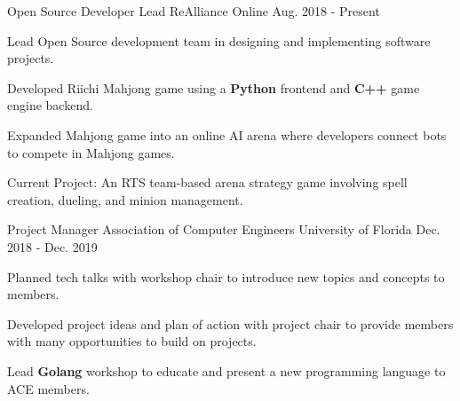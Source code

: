 


\begin{cventries}


\cventry
{Open Source Developer Lead} %
{ReAlliance} %
{Online} %
{Aug. 2018 - Present} %
{ %
	\begin{cvitems}
		\setlength{\itemindent}{.125in}
		\item {Lead Open Source development team in designing and implementing software projects.}
		\item {Developed Riichi Mahjong game using a \textbf{Python} frontend and \textbf{C++} game engine backend.}
		\item {Expanded Mahjong game into an online AI arena where developers connect bots to compete in Mahjong games.}
		\item {Current Project: An RTS team-based arena strategy game involving spell creation, dueling, and minion management.}
	\end{cvitems}
}


\cventry
{Project Manager} %
{Association of Computer Engineers} %
{University of Florida} %
{Dec. 2018 - Dec. 2019} %
{ %
	\begin{cvitems}
		\setlength{\itemindent}{.125in}
		\item {Planned tech talks with workshop chair to introduce new topics and concepts to members.}
		\item {Developed project ideas and plan of action with project chair to provide members with many opportunities to build on projects.}
		\item{Lead \textbf{Golang} workshop to educate and present a new programming language to ACE members.}
	\end{cvitems}
}


\end{cventries}
